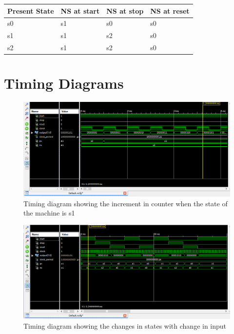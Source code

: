 \documentclass[12pt]{article}
\begin{document}
\begin{center}
\begin{tabular}{| l | l | l | l | }
\hline
 Present State & NS at start & NS at stop & NS at reset\\ \hline
 s0 & s1 & s0 & s0 \\ \hline
 s1 & s1 & s2 & s0 \\ \hline
 s2 & s1 & s2 & s0 \\ \hline
\end{tabular}
\end{center}
\newpage
\section{Timing Diagrams}
\begin{figure}[!ht]
\centering
\includegraphics[width=1\textwidth]{Capture}
\caption{Timing diagram showing the increment in counter when the state of the machine is s1}
\label{fig1}
\end{figure}

\begin{figure}
\centering
\includegraphics[width=1\textwidth]{Capture1}
\caption{Timing diagram showing the changes in states with change in input}
\label{fig2}
\end{figure}
\end{document}
